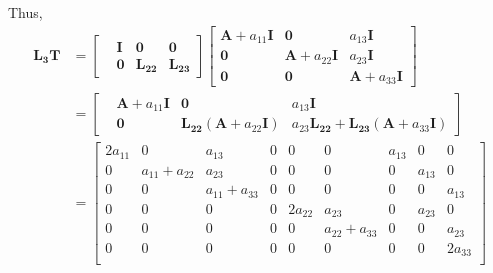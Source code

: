 \documentclass{article}
\begin{document}
Thus,
\begin{equation}
\begin{aligned}
\mathbf{L_3}\mathbf{T} &=
\begin{bmatrix}
&\mathbf{I} &\mathbf{0} &\mathbf{0} \\
&\mathbf{0} &\mathbf{L_{22}} &\mathbf{L_{23}}
\end{bmatrix}
\begin{bmatrix}
\mathbf{A}+a_{11}\mathbf{I} & \mathbf{0} & a_{13}\mathbf{I} \\
\mathbf{0} & \mathbf{A}+a_{22}\mathbf{I} & a_{23}\mathbf{I} \\
\mathbf{0} & \mathbf{0} & \mathbf{A}+a_{33}\mathbf{I}
\end{bmatrix} \\
&=
\begin{bmatrix}
&\mathbf{A}+a_{11}\mathbf{I} &\mathbf{0} &a_{13}\mathbf{I} \\
&\mathbf{0} &\mathbf{L_{22}}(\mathbf{A}+a_{22}\mathbf{I}) &a_{23} \mathbf{L_{22}}+  \mathbf{L_{23}}(\mathbf{A}+a_{33}\mathbf{I})
\end{bmatrix} \\
&=
\begin{bmatrix}
2a_{11} &0 &a_{13} &0 &0 &0 &a_{13} &0 &0\\
0 &a_{11}+a_{22} &a_{23} &0 &0 &0 &0 &a_{13} &0\\
0 &0 &a_{11}+a_{33} &0 &0 &0 &0 &0 &a_{13}\\
0 &0 &0 &0 &2a_{22} &a_{23} &0 &a_{23} &0\\
0 &0 &0 &0 &0 &a_{22}+a_{33} &0 &0 &a_{23}\\
0 &0 &0 &0 &0 &0 &0 &0 &2a_{33}\\
\end{bmatrix}
\end{aligned}
\end{equation}
\end{document}

